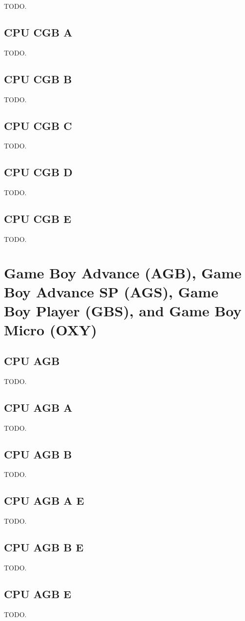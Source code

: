 TODO.

\subsection{CPU CGB A}

TODO.

\subsection{CPU CGB B}

TODO.

\subsection{CPU CGB C}

TODO.

\subsection{CPU CGB D}

TODO.

\subsection{CPU CGB E}

TODO.

\section{Game Boy Advance (AGB), Game Boy Advance SP (AGS), Game Boy Player (GBS), and Game Boy Micro (OXY)}

\subsection{CPU AGB}

TODO.

\subsection{CPU AGB A}

TODO.

\subsection{CPU AGB B}

TODO.

\subsection{CPU AGB A E}

TODO.

\subsection{CPU AGB B E}

TODO.

\subsection{CPU AGB E}

TODO.
